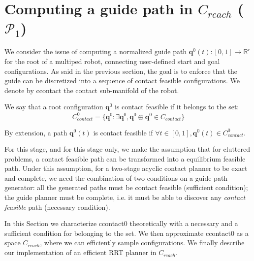 \section{Computing a guide path in $C_{reach}$ ($\mathcal{P}_1$) }
\label{rbprm}

We consider the issue of computing a normalized guide path $\mathbf{q}^0(t) : [0,1] \longrightarrow \mathbb{R}^r$ for the root of a multiped robot, connecting user-defined start and goal configurations. As said in the previous section, the goal is to enforce that the guide can be discretized into a sequence of \gls{contact feasible} configurations. We denote by \gls{ccontact} the contact sub-manifold of the robot.

We say that a root configuration $\mathbf{q}^{0}$ is \gls{contact feasible} if it belongs to the set:
\begin{equation}
      C_{contact}^0= \{ \mathbf{q}^{0}: \exists \mathbf{q}^{\overline{0}}, \mathbf{q}^{0} \oplus \mathbf{q}^{\overline{0}} \in C_{contact} \}
    \label{eq:pi}
\end{equation}

By extension, a path $\mathbf{q}^0(t)$ is \gls{contact feasible} if $\forall t \in [0,1], \mathbf{q}^0(t) \in C_{contact}^0$.

For this stage, and for this stage only, we make the assumption that for \gls{cluttered} problems, a \gls{contact feasible} path can be transformed into a \gls{equilibrium feasible} path.
Under this assumption, for a two-stage acyclic contact planner to be exact and complete, we need the combination of two conditions on a guide path generator: all the generated paths must be \gls{contact feasible} (sufficient condition); the guide planner must be complete, i.e. it must be able to discover any \textit{contact feasible} path (necessary condition).

In this Section we characterize \gls{ccontact0} theoretically with a necessary and a sufficient condition for belonging to the set.
We then approximate \gls{ccontact0} as a space $C_{reach}$, where we can efficiently sample configurations.
We finally describe our implementation of an efficient RRT planner in $C_{reach}$.

   
 
